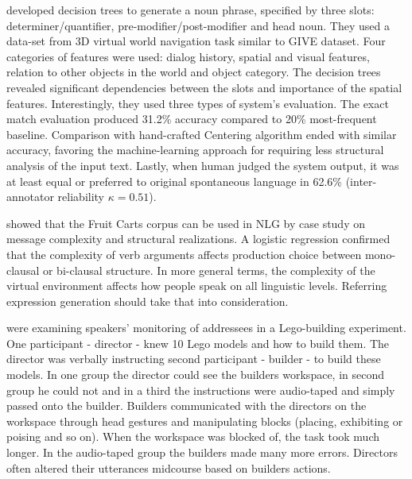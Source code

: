\citet{stoia2006noun} developed decision trees to generate a noun phrase, specified by three slots: determiner/quantifier, pre-modifier/post-modifier and head noun. They used a data-set from 3D virtual world navigation task similar to GIVE dataset. Four categories of features were used: dialog history, spatial and visual features, relation to other objects in the world and object category. The decision trees revealed significant dependencies between the slots and importance of the spatial features. Interestingly, they used three types of system's evaluation. The exact match evaluation produced 31.2\% accuracy compared to 20\% most-frequent baseline. Comparison with hand-crafted Centering algorithm \citep{kibble2000integrated} ended with similar accuracy, favoring the machine-learning approach for requiring less structural analysis of the input text. Lastly, when human judged the system output, it was at least equal or preferred to original spontaneous language in 62.6\% (inter-annotator reliability $\kappa = 0.51$).

\citet{gallo2008production} showed that the Fruit Carts corpus can be used in NLG by case study on message complexity and structural realizations. A logistic regression confirmed that the complexity of verb arguments affects production choice between mono-clausal or bi-clausal structure. In more general terms, the complexity of the virtual environment affects how people speak on all linguistic levels. Referring expression generation should take that into consideration.

\citet{clark2004speaking} were examining speakers' monitoring of addressees in a Lego-building experiment. One participant - director - knew 10 Lego models and how to build them. The director was verbally instructing second participant - builder - to build these models. In one group the director could see the builders workspace, in second group he could not and in a third the instructions were audio-taped and simply passed onto the builder. Builders communicated with the directors on the workspace through head gestures and manipulating blocks (placing, exhibiting or poising and so on). When the workspace was blocked of, the task took much longer. In the audio-taped group the builders made many more errors. Directors often altered their utterances midcourse based on builders actions.